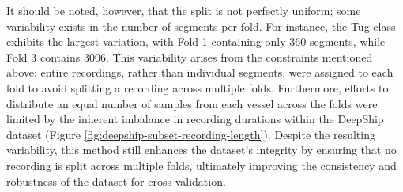 It should be noted, however, that the split is not perfectly uniform; some variability exists in the number of segments per fold. For instance, the Tug class exhibits the largest variation, with Fold 1 containing only 360 segments, while Fold 3 contains 3006. This variability arises from the constraints mentioned above: entire recordings, rather than individual segments, were assigned to each fold to avoid splitting a recording across multiple folds. Furthermore, efforts to distribute an equal number of samples from each vessel across the folds were limited by the inherent imbalance in recording durations within the DeepShip dataset (Figure \ref{fig:deepship-subset-recording-length}). Despite the resulting variability, this method still enhances the dataset's integrity by ensuring that no recording is split across multiple folds, ultimately improving the consistency and robustness of the dataset for cross-validation.

